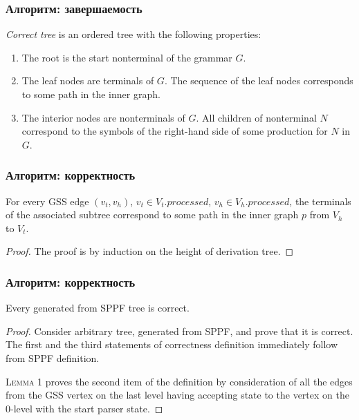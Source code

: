 \documentclass{beamer}
\begin{document}
\begin{frame}
    \transwipe[direction=90]
    \frametitle{Алгоритм: завершаемость}
    \begin{definition}
         \emph{Correct tree} is an ordered tree with the following properties:
        \begin{enumerate}
            \item The root is the start nonterminal of the grammar $G$.
            \item The leaf nodes are terminals of $G$. The sequence of the leaf nodes corresponds to some path in the inner graph. 
            \item The interior nodes are nonterminals of $G$. All children of nonterminal $N$ correspond to the symbols of the right-hand side of some production for $N$ in $G$.
        \end{enumerate}
    \end{definition}
\end{frame}

\begin{frame}
    \transwipe[direction=90]
    \frametitle{Алгоритм: корректность}
        \begin{lemma}[Lemma 1]
    For every GSS edge $(v_{t}, v_{h})$, $v_{t} \in V_{t}.processed$, $v_{h} \in V_{h}.processed$, the terminals of the associated subtree correspond to some path in the inner graph $p$ 
from $V_{h}$ to $V_{t}$.
    \end{lemma}

    \begin{proof}
        The proof is by induction on the height of derivation tree.
    \end{proof}

\end{frame}

\begin{frame}
    \transwipe[direction=90]
    \frametitle{Алгоритм: корректность}
    \begin{theorem}
       Every generated from SPPF tree is correct.
    \end{theorem}

    \begin{proof}
      Consider arbitrary tree, generated from SPPF, and prove that it is correct. The first and the third statements
of correctness definition immediately follow from SPPF definition. 

\textsc{Lemma 1} proves the second item of the definition by consideration of all the edges from the GSS vertex
on the last level having accepting state to the vertex on the 0-level with the start parser state.

    \end{proof}

\end{frame}
\end{document}
